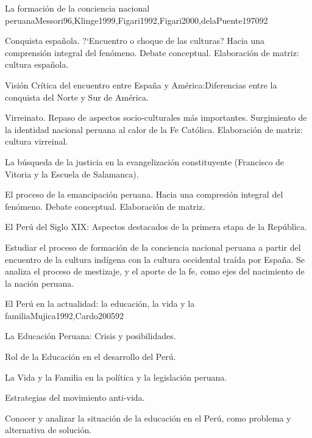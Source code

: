 \begin{syllabus}
\begin{unit}{La formación de la conciencia nacional peruana}{Messori96,Klinge1999,Figari1992,Figari2000,delaPuente1970}{9}{2}
\begin{topics}
      \item Conquista española. ?`Encuentro o choque de las culturas? Hacia una comprensión integral del fenómeno. Debate conceptual. Elaboración de matriz: cultura española.
      \item Visión Crítica del encuentro entre España y América:Diferencias entre la conquista del Norte y Sur de América.
      \item Virreinato. Repaso de aspectos socio-culturales más importantes. Surgimiento de la identidad nacional peruana al calor de la Fe Católica. Elaboración de matriz: cultura virreinal.
      \item La búsqueda de la justicia en la evangelización constituyente (Francisco de Vitoria y la Escuela de Salamanca).
      \item El proceso de la emancipación peruana. Hacia una compresión integral del fenómeno. Debate conceptual. Elaboración de matriz.
      \item El Perú del Siglo XIX: Aspectos destacados de la primera etapa de la República.
\end{topics}
\begin{learningoutcomes}
      \item Estudiar el proceso de formación de la conciencia nacional peruana a partir del encuentro de la cultura indígena con la cultura occidental traída por España. Se analiza el proceso de mestizaje, y el aporte de la fe, como ejes del nacimiento de la nación peruana.
\end{learningoutcomes}
\end{unit}

\begin{unit}{El Perú en la actualidad: la educación, la vida y la familia}{Mujica1992,Cardo2005}{9}{2}
\begin{topics}
      \item La Educación Peruana: Crisis y posibilidades.
      \item Rol de la Educación en el desarrollo del Perú.
      \item La Vida y la Familia en la política y la legislación peruana.
      \item Estrategias del movimiento anti-vida.
\end{topics}
\begin{learningoutcomes}
      \item Conocer y analizar la situación de la educación en el Perú, como problema y alternativa de solución.
\end{learningoutcomes}
\end{unit}


\end{syllabus}
